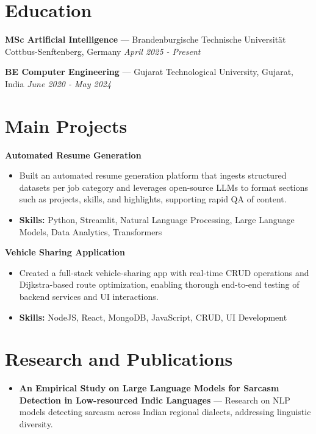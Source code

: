 \documentclass[a4paper,10pt]{article}
\begin{document}
\section*{Education}
\textbf{MSc Artificial Intelligence} — Brandenburgische Technische Universität Cottbus-Senftenberg, Germany \hfill \textit{April 2025 - Present}\par
\vspace{1.5pt}
\textbf{BE Computer Engineering} — Gujarat Technological University, Gujarat, India \hfill \textit{June 2020 - May 2024}\par

\section*{Main Projects}
\textbf{Automated Resume Generation}\par
\vspace{1pt}
\begin{itemize}
  \item Built an automated resume generation platform that ingests structured datasets per job category and leverages open-source LLMs to format sections such as projects, skills, and highlights, supporting rapid QA of content.
  \item \textbf{Skills:} Python, Streamlit, Natural Language Processing, Large Language Models, Data Analytics, Transformers
\end{itemize}
\vspace{3pt}
\textbf{Vehicle Sharing Application}\par
\vspace{1pt}
\begin{itemize}
  \item Created a full-stack vehicle-sharing app with real-time CRUD operations and Dijkstra-based route optimization, enabling thorough end-to-end testing of backend services and UI interactions.
  \item \textbf{Skills:} NodeJS, React, MongoDB, JavaScript, CRUD, UI Development
\end{itemize}

\section*{Research and Publications}
\begin{itemize}
\item \textbf{An Empirical Study on Large Language Models for Sarcasm Detection in Low-resourced Indic Languages} — Research on NLP models detecting sarcasm across Indian regional dialects, addressing linguistic diversity.
\end{itemize}
\end{document}
